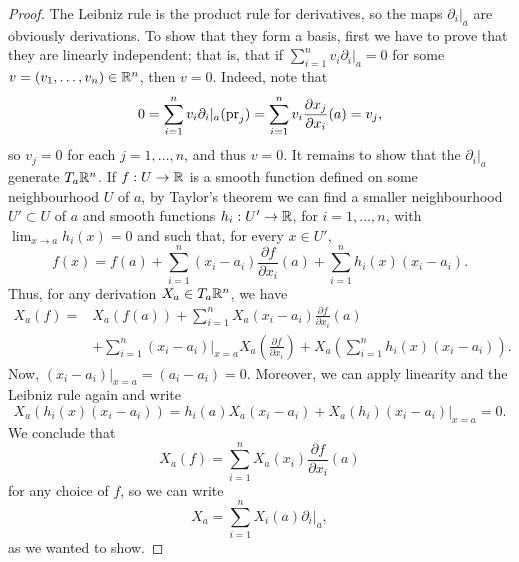 \documentclass[11pt,a4paper]{book}
\theoremstyle{remark} \newtheorem{rmk}[thm]{Remark}
\theoremstyle{definition} \newtheorem{defn}[thm]{Definition}
\theoremstyle{definition} \newtheorem{ex}[thm]{Example}
\theoremstyle{definition} \newtheorem{ej}[thm]{Exercise}
\begin{document}
\begin{proof}
  The Leibniz rule is the product rule for derivatives, so the maps $\partial_i|_a$ are obviously derivations. To show that they form a basis, first we have to prove that they are linearly independent; that is, that if $\sum_{i=1}^n v_i \partial_i|_a=0$ for some $v=(v_1,\dots,v_n) \in \mathbb R^n$, then $v=0$. Indeed, note that
  \begin{equation*}
0 = \sum_{i=1}^n v_i \partial_i|_a (\operatorname{pr}_j) = \sum_{i=1}^n v_i \frac{\partial x_j}{\partial x_i}(a) = v_j,
  \end{equation*}
so $v_j=0$ for each $j=1,\dots,n$, and thus $v=0$. It remains to show that the $\partial_i|_a$ generate $T_a\mathbb R^n$. If $f:U\rightarrow \mathbb R$ is a smooth function defined on some neighbourhood $U$ of $a$, by Taylor's theorem we can find a smaller neighbourhood $U'\subset U$ of $a$ and smooth functions $h_i:U' \rightarrow \mathbb R$, for $i=1,\dots,n$, with $\lim_{x\rightarrow a}h_i(x)=0$ and such that, for every $x\in U'$,
\begin{equation*}
f(x) = f(a) + \sum_{i=1}^n (x_i-a_i) \frac{\partial f}{\partial x_i}(a) + \sum_{i=1}^n h_i(x)(x_i-a_i).
\end{equation*}
Thus, for any derivation $X_a\in T_a\mathbb R^n$, we have
\begin{align*}
X_a(f) =& X_a(f(a)) + \sum_{i=1}^n X_a(x_i-a_i) \frac{\partial f}{\partial x_i}(a) \\ & + \sum_{i=1}^n (x_i-a_i)|_{x=a} X_a \left( \frac{\partial f}{\partial x_i} \right) + X_a \left( \sum_{i=1}^n h_i(x)(x_i-a_i) \right).
\end{align*}
Now, $(x_i-a_i)|_{x=a}=(a_i-a_i)=0$. Moreover, we can apply linearity and the Leibniz rule again and write
\begin{equation*}
X_a(h_i(x)(x_i-a_i)) = h_i(a) X_a(x_i-a_i) + X_a(h_i) (x_i-a_i)|_{x=a} = 0.
\end{equation*}
We conclude that
\begin{equation*}
X_a(f) = \sum_{i=1}^n X_a(x_i) \frac{\partial f}{\partial x_i} (a)
\end{equation*}
for any choice of $f$, so we can write
\begin{equation*}
X_a = \sum_{i=1}^n X_i(a) \partial_i|_a,
\end{equation*}
as we wanted to show.
\end{proof}
\end{document}
